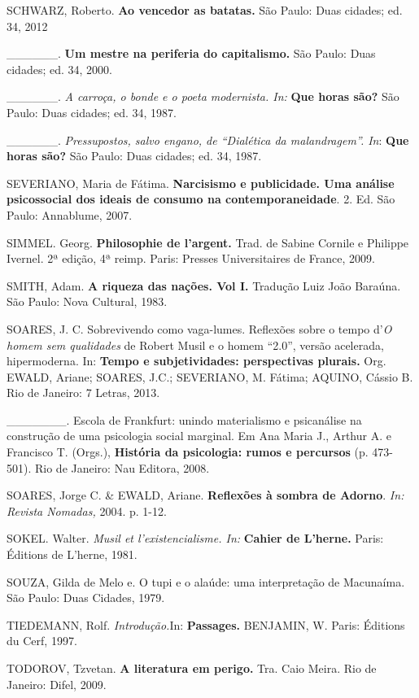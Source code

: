 SCHWARZ, Roberto. \textbf{Ao vencedor as batatas.} São Paulo: Duas
cidades; ed. 34, 2012

\_\_\_\_\_\_. \textbf{Um mestre na periferia do capitalismo.} São Paulo:
Duas cidades; ed. 34, 2000.

\_\_\_\_\_\_. \emph{A carroça, o bonde e o poeta modernista. In:}
\textbf{Que horas são?} São Paulo: Duas cidades; ed. 34, 1987.

\_\_\_\_\_\_. \emph{Pressupostos, salvo engano, de ``Dialética da
malandragem''. In}: \textbf{Que horas são?} São Paulo: Duas cidades; ed.
34, 1987.

SEVERIANO, Maria de Fátima. \textbf{Narcisismo e publicidade. Uma
análise psicossocial dos ideais de consumo na contemporaneidade}. 2. Ed.
São Paulo: Annablume, 2007.

SIMMEL. Georg. \textbf{Philosophie de l'argent.} Trad. de Sabine Cornile
e Philippe Ivernel. 2ª edição, 4ª reimp. Paris: Presses Universitaires
de France, 2009.

SMITH, Adam. \textbf{A riqueza das nações. Vol I.} Tradução Luiz João
Baraúna. São Paulo: Nova Cultural, 1983.

SOARES, J. C. Sobrevivendo como vaga-lumes. Reflexões sobre o tempo
d'\emph{O homem sem qualidades} de Robert Musil e o homem ``2.0'',
versão acelerada, hipermoderna. In: \textbf{Tempo e subjetividades:
perspectivas plurais.} Org. EWALD, Ariane; SOARES, J.C.; SEVERIANO, M.
Fátima; AQUINO, Cássio B. Rio de Janeiro: 7 Letras, 2013.

\_\_\_\_\_\_\_. Escola de Frankfurt: unindo materialismo e psicanálise
na construção de uma psicologia social marginal. Em Ana Maria J., Arthur
A. e Francisco T. (Orgs.), \textbf{História da psicologia: rumos e
percursos} (p. 473-501). Rio de Janeiro: Nau Editora, 2008.

SOARES, Jorge C. \& EWALD, Ariane. \textbf{Reflexões à sombra de
Adorno}. \emph{In: Revista Nomadas,} 2004. p. 1-12.

SOKEL. Walter. \emph{Musil et l'existencialisme. In:} \textbf{Cahier de
L'herne.} Paris: Éditions de L'herne, 1981.

SOUZA, Gilda de Melo e. O tupi e o alaúde: uma interpretação de
Macunaíma. São Paulo: Duas Cidades, 1979.

TIEDEMANN, Rolf. \emph{Introdução.}In: \textbf{Passages.} BENJAMIN, W.
Paris: Éditions du Cerf, 1997.

TODOROV, Tzvetan. \textbf{A literatura em perigo.} Tra. Caio Meira. Rio
de Janeiro: Difel, 2009.

